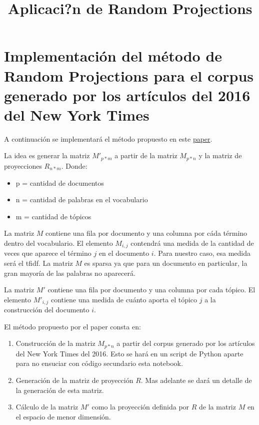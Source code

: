 \documentclass[11pt]{article}
\title{Aplicaci?n de Random Projections}
\providecommand{\tightlist}{%
      \setlength{\itemsep}{0pt}\setlength{\parskip}{0pt}}
\begin{document}
    
    
    \maketitle
    
    

    
    \section{Implementación del método de Random Projections para el corpus
generado por los artículos del 2016 del New York
Times}\label{implementaciuxf3n-del-muxe9todo-de-random-projections-para-el-corpus-generado-por-los-artuxedculos-del-2016-del-new-york-times}

A continuación se implementará el método propuesto en este
\href{./random-indexing-dr-explained.pdf}{paper}.

    La idea es generar la matriz \(M'_{p*m}\) a partir de la matriz
\(M_{p*n}\) y la matriz de proyecciones \(R_{n*m}\). Donde:

\begin{itemize}
\tightlist
\item
  p = cantidad de documentos
\item
  n = cantidad de palabras en el vocabulario
\item
  m = cantidad de tópicos
\end{itemize}

La matriz \(M\) contiene una fila por documento y una columna por cáda
término dentro del vocabulario. El elemento \(M_{i,j}\) contendrá una
medida de la cantidad de veces que aparece el término \(j\) en el
documento \(i\). Para nuestro caso, esa medida será el tfidf. La matriz
\(M\) es sparsa ya que para un documento en particular, la gran mayoría
de las palabras no aparecerá.

La matriz \(M'\) contiene una fila por documento y una columna por cada
tópico. El elemento \(M'_{i,j}\) contiene una medida de cuánto aporta el
tópico \(j\) a la construcción del documento \(i\).

El método propuesto por el paper consta en:

\begin{enumerate}
\def\labelenumi{\arabic{enumi})}
\item
  Construcción de la matriz \(M_{p*n}\) a partir del corpus generado por
  los artículos del New York Times del 2016. Esto se hará en un script
  de Python aparte para no ensuciar con código secundario esta notebook.
\item
  Generación de la matriz de proyección \(R\). Mas adelante se dará un
  detalle de la generación de esta matriz.
\item
  Cálculo de la matriz \(M'\) como la proyección definida por \(R\) de
  la matriz \(M\) en el espacio de menor dimensión.
\end{enumerate}
\end{document}
